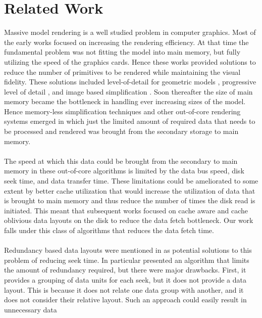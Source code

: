 
\section{Related Work}

Massive model rendering is a well studied problem in computer graphics. Most of
the early works focused on increasing the rendering efficiency. At that time
the fundamental problem was not fitting the model into main memory, but
fully utilizing the speed of the graphics cards. Hence these works provided
solutions to reduce the number of primitives to be rendered while maintaining
the visual fidelity. These solutions included level-of-detail for geometric
models \cite{Luebke02}, progressive level of detail
\cite{Hoppe:98b,Hoppe:97,Hoppe:96,SG:01}, and image based simplification
\cite{ACWBZEHHSBWBM:99}. Soon thereafter the size of main memory became the
bottleneck in handling ever increasing sizes of the model. Hence memory-less
simplification techniques \cite{LT:99}  and other out-of-core rendering systems
\cite{Silva02,VM:02} emerged in which just the limited amount of required data
that needs to be processed and rendered was brought from the secondary storage
to main memory. \\
\\
The speed at which this data
could be brought from the secondary to main memory in these out-of-core
algorithms is limited by the data bus speed, disk seek time, and data transfer
time. These limitations could be ameliorated to some extent by
better cache utilization that would increase the utilization of data that is
brought to main memory and thus reduce the number of times the disk read is
initiated. This meant that subsequent works focused on cache aware
\cite{ssdpaper} and cache oblivious data layouts
\cite{cacheobliviouslayout,YOON:2006:MeshLayout} on the disk to reduce the
data fetch bottleneck. Our work falls under this class of algorithms that
reduces the data fetch time. \\
\\
Redundancy based data layouts were mentioned in
\cite{Patterson88,singleseeklayout,optimizingredundancy} as potential solutions
to this problem of reducing seek time. In particular
\cite{optimizingredundancy} presented an algorithm that limits the amount of
redundancy required, but there were major drawbacks. First, it provides a
grouping of data units for each seek, but it does not provide a data layout.
This is because it does not relate one data group with another, and it does not
consider their relative layout. Such an approach could easily result in unnecessary data
